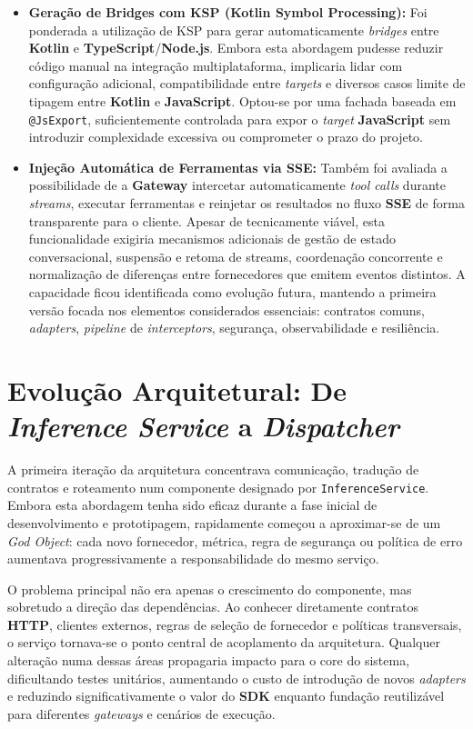 \begin{itemize}

\item \textbf{Geração de Bridges com KSP (Kotlin Symbol Processing):}
Foi ponderada a utilização de KSP para gerar automaticamente \textit{bridges} entre \textbf{Kotlin} e \textbf{TypeScript}/\textbf{Node.js}. Embora esta abordagem pudesse reduzir código manual na integração multiplataforma, implicaria lidar com configuração adicional, compatibilidade entre \textit{targets} e diversos casos limite de tipagem entre \textbf{Kotlin} e \textbf{JavaScript}. Optou-se por uma fachada baseada em \texttt{@JsExport}, suficientemente controlada para expor o \textit{target} \textbf{JavaScript} sem introduzir complexidade excessiva ou comprometer o prazo do projeto.

\item \textbf{Injeção Automática de Ferramentas via SSE:}
Também foi avaliada a possibilidade de a \textbf{Gateway} intercetar automaticamente \textit{tool calls} durante \textit{streams}, executar ferramentas e reinjetar os resultados no fluxo \textbf{SSE} de forma transparente para o cliente. Apesar de tecnicamente viável, esta funcionalidade exigiria mecanismos adicionais de gestão de estado conversacional, suspensão e retoma de streams, coordenação concorrente e normalização de diferenças entre fornecedores que emitem eventos distintos. A capacidade ficou identificada como evolução futura, mantendo a primeira versão focada nos elementos considerados essenciais: contratos comuns, \textit{adapters}, \textit{pipeline} de \textit{interceptors}, segurança, observabilidade e resiliência.
\end{itemize}


\section{Evolução Arquitetural: De \textit{Inference Service} a \textit{Dispatcher}}

A primeira iteração da arquitetura concentrava comunicação, tradução de contratos e roteamento num componente designado por \texttt{InferenceService}. Embora esta abordagem tenha sido eficaz durante a fase inicial de desenvolvimento e prototipagem, rapidamente começou a aproximar-se de um \textit{God Object}: cada novo fornecedor, métrica, regra de segurança ou política de erro aumentava progressivamente a responsabilidade do mesmo serviço.

O problema principal não era apenas o crescimento do componente, mas sobretudo a direção das dependências. Ao conhecer diretamente contratos \textbf{HTTP}, clientes externos, regras de seleção de fornecedor e políticas transversais, o serviço tornava-se o ponto central de acoplamento da arquitetura. Qualquer alteração numa dessas áreas propagaria impacto para o core do sistema, dificultando testes unitários, aumentando o custo de introdução de novos \textit{adapters} e reduzindo significativamente o valor do \textbf{SDK} enquanto fundação reutilizável para diferentes \textit{gateways} e cenários de execução.

